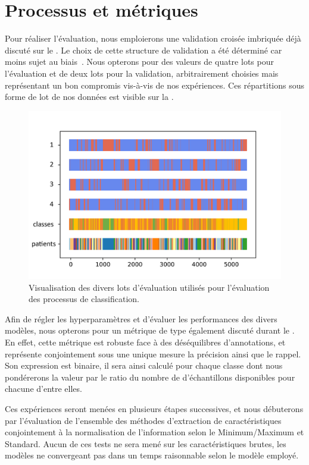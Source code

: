 \section{Processus et métriques}
Pour réaliser l'évaluation, nous emploierons une validation croisée imbriquée déjà discuté sur le . Le choix de cette structure de validation a été déterminé car moins sujet au biais~\cite{Cawley2010}. Nous opterons pour des valeurs de quatre lots pour l'évaluation et de deux lots pour la validation, arbitrairement choisies mais représentant un bon compromis vis-à-vis de nos expériences. Ces répartitions sous forme de lot de nos données est visible sur la .\par

\begin{figure}[H]
    \centering
    \includegraphics[width=0.7\linewidth]{contents/chapter_4/resources/visualisation_folds.png}
    \caption{Visualisation des divers lots d'évaluation utilisés pour l'évaluation des processus de classification.}
    \label{fig:visualisation_folds}
\end{figure}\par

Afin de régler les hyperparamètres et d'évaluer les performances des divers modèles, nous opterons pour un métrique de type \fscore également discuté durant le . En effet, cette métrique est robuste face à des déséquilibres d'annotations, et représente conjointement sous une unique mesure la précision ainsi que le rappel. Son expression est binaire, il sera ainsi calculé pour chaque classe dont nous pondérerons la valeur par le ratio du nombre de d'échantillons disponibles pour chacune d'entre elles.\par

Ces expériences seront menées en plusieurs étapes successives, et nous débuterons par l'évaluation de l'ensemble des méthodes d'extraction de caractéristiques conjointement à la normalisation de l'information selon le Minimum/Maximum et Standard. Aucun de ces tests ne sera mené sur les caractéristiques brutes, les modèles ne convergeant pas dans un temps raisonnable selon le modèle employé.\par

